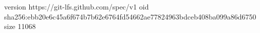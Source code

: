version https://git-lfs.github.com/spec/v1
oid sha256:ebb20e6c45a6f674b7b62e6764fd54662ae77824963bdceb408ba099a86d6750
size 11068
